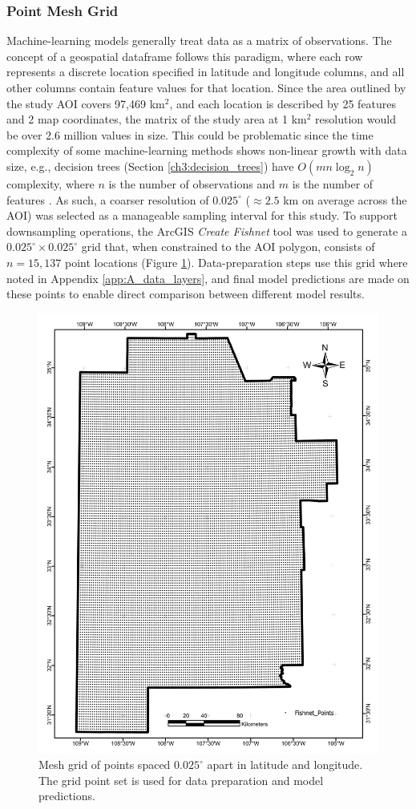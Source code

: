 \subsubsection{Point Mesh Grid}
\label{ch3:meshgrid}
Machine-learning models generally treat data as a matrix of observations. The concept of a geospatial dataframe follows this paradigm, where each row represents a discrete location specified in latitude and longitude columns, and all other columns contain feature values for that location. Since the area outlined by the study AOI covers 97,469 km$^2$, and each location is described by 25 features and 2 map coordinates, the matrix of the study area at 1 km$^2$ resolution would be over 2.6 million values in size. This could be problematic since the time complexity of some machine-learning methods shows non-linear growth with data size, e.g., decision trees (Section \ref{ch3:decision_trees}) have $O(mn\log_2n)$ complexity, where $n$ is the number of observations and $m$ is the number of features \citep{sani_computational_2018}. As such, a coarser resolution of $0.025^\circ$ ($\approx2.5$ km on average across the AOI) was selected as a manageable sampling interval for this study. To support downsampling operations, the ArcGIS \textit{Create Fishnet} tool was used to generate a $0.025^\circ\times0.025^\circ$ grid that, when constrained to the AOI polygon, consists of $n=15,137$ point locations (Figure \ref{fig:meshgrid}). Data-preparation steps use this grid where noted in Appendix \ref{app:A_data_layers}, and final model predictions are made on these points to enable direct comparison between different model results. 

\begin{figure}
\centering
\includegraphics[width=0.75\linewidth]{templates/images/Figure-Fishnet.pdf}
\caption[Mesh grid point set]{Mesh grid of points spaced $0.025^\circ$ apart in latitude and longitude. The grid point set is used for data preparation and model predictions.} 
\label{fig:meshgrid}
\end{figure}

